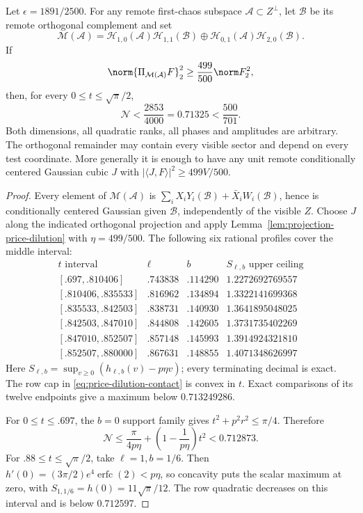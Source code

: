 \begin{theorem}
\label{thm:conditional-response-contact}
Let $\epsilon=1891/2500$. For any remote first-chaos subspace
$\mathcal A\subset Z^\perp$, let $\mathcal B$ be its remote
orthogonal complement and set
\[
 \mathcal M(\mathcal A)=
 \mathcal H_{1,0}(\mathcal A)\mathcal H_{1,1}(\mathcal B)
 \oplus\mathcal H_{0,1}(\mathcal A)\mathcal H_{2,0}(\mathcal B).
\]
If
\begin{equation}\label{eq:one-leg-contact-share}
 \norm{\Pi_{\mathcal M(\mathcal A)}F}_2^2
          \ge\frac{499}{500}\norm F_2^2,
\end{equation}
then, for every $0\le t\le\sqrt\pi/2$,
\[
 \boxed{\mathcal N<\frac{2853}{4000}=0.71325<\frac{500}{701}.}
\]
Both dimensions, all quadratic ranks, all phases and amplitudes are
arbitrary. The orthogonal remainder may contain every visible sector
and depend on every test coordinate. More generally it is enough to
have any unit remote conditionally centered Gaussian cubic $J$ with
$|\langle J,F\rangle|^2\ge499V/500$.
\end{theorem}
\begin{proof}
Every element of $\mathcal M(\mathcal A)$ is
$\sum_iX_iY_i(\mathcal B)+\bar X_iW_i(\mathcal B)$, hence is
conditionally centered Gaussian given $\mathcal B$, independently of
the visible $Z$. Choose $J$ along the indicated orthogonal projection
and apply Lemma~\ref{lem:projection-price-dilution} with $\eta=499/500$.
The following six rational profiles cover the middle interval:
\[
\begin{array}{c|c|c|c}
 t\text{ interval}&\ell&b&S_{\ell,b}\text{ upper ceiling}\\\hline
 {[.697,.810406]}&.743838&.114290&1.2272692769557\\
 {[.810406,.835533]}&.816962&.134894&1.3322141699368\\
 {[.835533,.842503]}&.838731&.140930&1.3641895048025\\
 {[.842503,.847010]}&.844808&.142605&1.3731735402269\\
 {[.847010,.852507]}&.857148&.145993&1.3914924321810\\
 {[.852507,.880000]}&.867631&.148855&1.4071348626997
\end{array}
\]
Here $S_{\ell,b}=\sup_{v\ge0}(h_{\ell,b}(v)-p\eta v)$;
every terminating decimal is exact. The row cap in
\eqref{eq:price-dilution-contact} is convex in $t$. Exact comparisons
of its twelve endpoints give a maximum below $0.713249286$.

For $0\le t\le.697$, the $b=0$ support family gives
$t^2+p^2r^2\le\pi/4$. Therefore
\[
 \mathcal N\le\frac{\pi}{4p\eta}
       +\left(1-\frac1{p\eta}\right)t^2<0.712873.
\]
For $.88\le t\le\sqrt\pi/2$, take $\ell=1,b=1/6$.
Then $h'(0)=(3\pi/2)e^4\operatorname{erfc}(2)<p\eta$,
so concavity puts the scalar maximum at zero, with
$S_{1,1/6}=h(0)=11\sqrt\pi/12$.
The row quadratic decreases on this interval and is below $0.712597$.
\end{proof}

